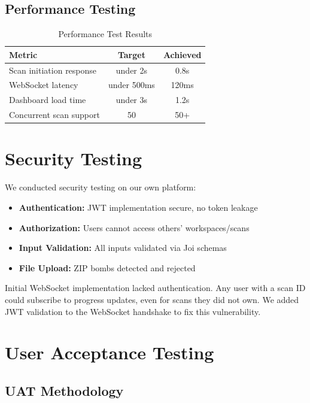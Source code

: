\documentclass[12pt,a4paper]{report}
\begin{document}
\subsection{Performance Testing}

\begin{table}[H]
\centering
\caption{Performance Test Results}
\label{tab:performance_tests}
\begin{tabular}{|l|c|c|}
\hline
\textbf{Metric} & \textbf{Target} & \textbf{Achieved} \\
\hline
Scan initiation response & under 2s & 0.8s \\
\hline
WebSocket latency & under 500ms & 120ms \\
\hline
Dashboard load time & under 3s & 1.2s \\
\hline
Concurrent scan support & 50 & 50+ \\
\hline
\end{tabular}
\end{table}

\section{Security Testing}

We conducted security testing on our own platform:

\begin{itemize}
    \item \textbf{Authentication:} JWT implementation secure, no token leakage
    \item \textbf{Authorization:} Users cannot access others' workspaces/scans
    \item \textbf{Input Validation:} All inputs validated via Joi schemas
    \item \textbf{File Upload:} ZIP bombs detected and rejected
\end{itemize}

\begin{failbox}
Initial WebSocket implementation lacked authentication. Any user with a scan ID could subscribe to progress updates, even for scans they did not own. We added JWT validation to the WebSocket handshake to fix this vulnerability.
\end{failbox}

\section{User Acceptance Testing}

\subsection{UAT Methodology}
\end{document}
